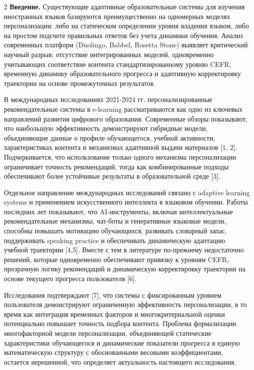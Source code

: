 \begin{multicols}{2}
{\bfseries Введение.} Существующие адаптивные образовательные системы для
изучения иностранных языков базируются преимущественно на одномерных
моделях персонализации: либо на статическом определении уровня владения
языком, либо на простом подсчете правильных ответов без учета динамики
обучения. Анализ современных платформ (Duolingo, Babbel, Rosetta Stone)
выявляет критический научный разрыв: отсутствие интегрированных моделей,
одновременно учитывающих соответствие контента стандартизированному
уровню CEFR, временную динамику образовательного прогресса и адаптивную
корректировку траектории на основе промежуточных результатов.

В международных исследованиях 2021-2024 гг. персонализированные
рекомендательные системы в e-learning рассматриваются как одно из
ключевых направлений развития цифрового образования. Современные обзоры
показывают, что наибольшую эффективность демонстрируют гибридные модели,
объединяющие данные о профиле обучающегося, учебной активности,
характеристиках контента и механизмах адаптивной выдачи материалов {[}1,
2{]}. Подчеркивается, что использование только одного механизма
персонализации ограничивает точность рекомендаций, тогда как
комбинированные подходы обеспечивают более устойчивые результаты в
образовательной среде {[}3{]}.

Отдельное направление международных исследований связано с adaptive
learning systems и применением искусственного интеллекта в языковом
обучении. Работы последних лет показывают, что AI-инструменты, включая
интеллектуальные рекомендательные механизмы, чат-боты и генеративные
языковые модели, способны повышать мотивацию обучающихся, развивать
словарный запас, поддерживать speaking practice и обеспечивать
динамическую адаптацию учебной траектории {[}4,5{]}. Вместе с тем в
литературе по-прежнему недостаточно решений, которые одновременно
обеспечивают привязку к уровням CEFR, прозрачную логику рекомендаций и
динамическую корректировку траектории на основе текущего прогресса
пользователя {[}6{]}.

Исследования подтверждают {[}7{]}, что системы с фиксированным уровнем
пользователя демонстрируют ограниченную эффективность персонализации, в
то время как интеграция временных факторов и многокритериальной оценки
потенциально повышает точность подбора контента. Проблема формализации
многофакторной модели персонализации, объединяющей статические
характеристики обучающегося и динамические показатели прогресса в единую
математическую структуру с обоснованными весовыми коэффициентами,
остается нерешенной, что определяет актуальность настоящего
исследования.


\end{multicols}

